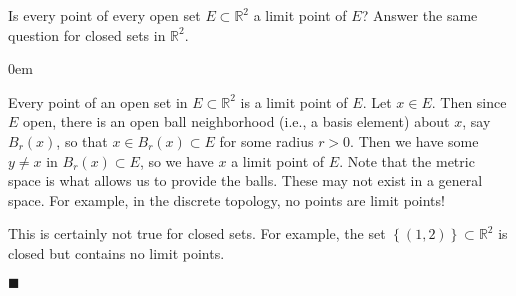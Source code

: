 \documentclass[12pt]{article}
\renewcommand{\qed}{\hfill$\blacksquare$}
\renewenvironment{proof}{\begin{addmargin}[1em]{0em}\begin{newproof}}{\end{newproof}\end{addmargin}\qed}
\newenvironment{problem}[2][Exercise]{\begin{trivlist}
\item[\hskip \labelsep {\bfseries #1}\hskip \labelsep {\bfseries #2.}]}{\end{trivlist}}
\begin{document}
\begin{problem}{2.8}
Is every point of every open set $E \subset \mathbb{R}^2$ a limit point of $E$? Answer the same question for closed sets in $\mathbb{R}^2$.
\end{problem}
\begin{proof}
Every point of an open set in $E\subset \mathbb{R}^2$ is a limit point of $E$. Let $x\in E$. Then since $E$ open, there is an open ball neighborhood (i.e., a basis element) about $x$, say $B_r\left(x\right)$, so that $x\in B_r\left(x\right) \subset E$ for some radius $r>0$. Then we have some $y\neq x$ in $B_r\left(x\right) \subset E$, so we have $x$ a limit point of $E$. {\color{red}Note that the metric space is what allows us to provide the balls. These may not exist in a general space. For example, in the discrete topology, no points are limit points!}

This is certainly not true for closed sets. For example, the set $\left\{\left(1,2\right)\right\}\subset \mathbb{R}^2$ is closed but contains no limit points.
\end{proof}
\end{document}
